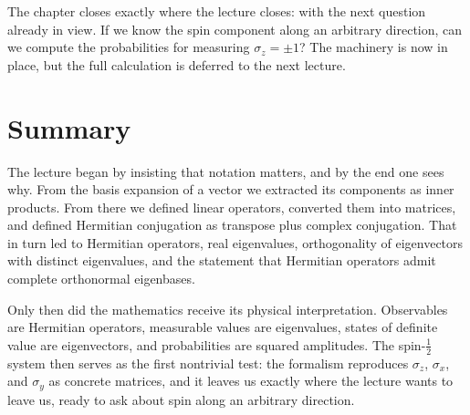 The chapter closes exactly where the lecture closes: with the next question already in view. If we know the spin component along an arbitrary direction, can we compute the probabilities for measuring \(\sigma_z=\pm1\)? The machinery is now in place, but the full calculation is deferred to the next lecture.

\section{Summary}

The lecture began by insisting that notation matters, and by the end one sees why. From the basis expansion of a vector we extracted its components as inner products. From there we defined linear operators, converted them into matrices, and defined Hermitian conjugation as transpose plus complex conjugation. That in turn led to Hermitian operators, real eigenvalues, orthogonality of eigenvectors with distinct eigenvalues, and the statement that Hermitian operators admit complete orthonormal eigenbases.

Only then did the mathematics receive its physical interpretation. Observables are Hermitian operators, measurable values are eigenvalues, states of definite value are eigenvectors, and probabilities are squared amplitudes. The spin-\(\frac12\) system then serves as the first nontrivial test: the formalism reproduces \(\sigma_z\), \(\sigma_x\), and \(\sigma_y\) as concrete matrices, and it leaves us exactly where the lecture wants to leave us, ready to ask about spin along an arbitrary direction.